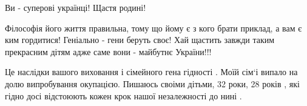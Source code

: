 \begin{itemize}
Ви - суперові українці! Щастя родині!

 

Філософія його життя правильна, тому що йому є з кого брати приклад, а вам є
ким гордитися! Геніально - гени беруть своє! Хай щастить завжди таким
прекрасним дітям адже саме вони - майбутнє України!!!


 

Це наслідки вашого виховання і сімейного гена гідності . Моїй сім‘і випало на
долю випробування окупацією. Пишаюсь своіми дітьми, 32 роки, 28 років , які
гідно досі відстоюють кожен крок нашої незалежності до нині .
\end{itemize}

